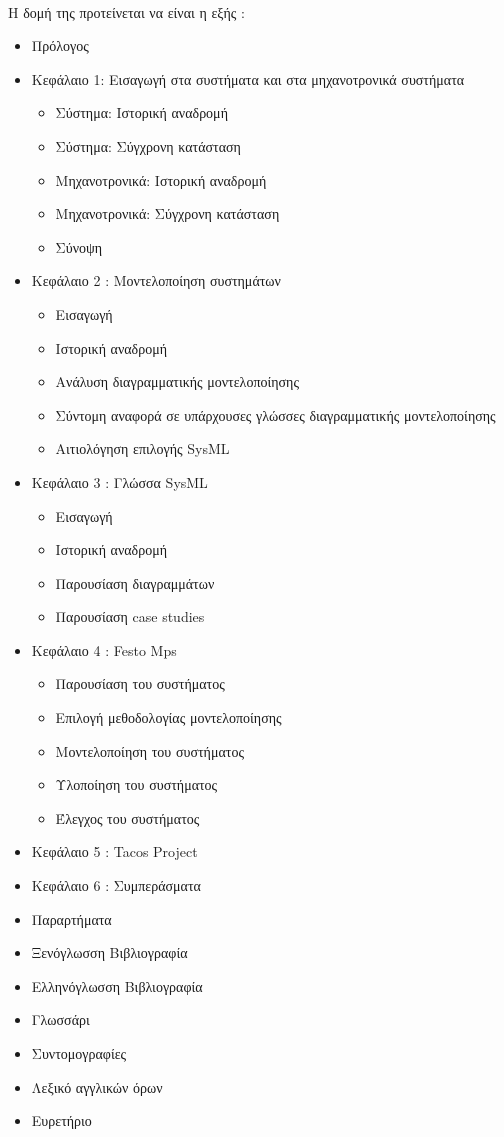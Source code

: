 \documentclass[a4paper, 12pt, twoside]{report}
\begin{document}
		\paragraph{}{Η δομή της προτείνεται να είναι η εξής :
			\begin{itemize}
				\item Πρόλογος
				\item Κεφάλαιο 1: Εισαγωγή στα συστήματα και στα μηχανοτρονικά συστήματα
					\begin{itemize}
						\item Σύστημα: Ιστορική αναδρομή
						\item Σύστημα: Σύγχρονη κατάσταση
						\item Μηχανοτρονικά: Ιστορική αναδρομή
						\item Μηχανοτρονικά: Σύγχρονη κατάσταση
						\item Σύνοψη
					\end{itemize}
				\item Κεφάλαιο 2 : Μοντελοποίηση συστημάτων
					\begin{itemize}
						\item Εισαγωγή
						\item Ιστορική αναδρομή
						\item Ανάλυση διαγραμματικής μοντελοποίησης
						\item Σύντομη αναφορά σε υπάρχουσες γλώσσες διαγραμματικής μοντελοποίησης
						\item Αιτιολόγηση επιλογής SysML
					\end{itemize}
				\item Κεφάλαιο 3 : Γλώσσα SysML
					\begin{itemize}
						\item Εισαγωγή
						\item Ιστορική αναδρομή
						\item Παρουσίαση διαγραμμάτων
						\item Παρουσίαση case studies
					\end{itemize}
				\item Κεφάλαιο 4 : Festo Mps
					\begin{itemize}
						\item Παρουσίαση του συστήματος
						\item Επιλογή μεθοδολογίας μοντελοποίησης
						\item Μοντελοποίηση του συστήματος
						\item Υλοποίηση του συστήματος
						\item Έλεγχος του συστήματος
					\end{itemize}
				\item Κεφάλαιο 5 : Tacos Project
				\item Κεφάλαιο 6 : Συμπεράσματα
				\item Παραρτήματα
				\item Ξενόγλωσση Βιβλιογραφία
				\item Ελληνόγλωσση Βιβλιογραφία
				\item Γλωσσάρι
				\item Συντομογραφίες
				\item Λεξικό αγγλικών όρων
				\item Ευρετήριο
			\end{itemize}
		}
		
\end{document}
